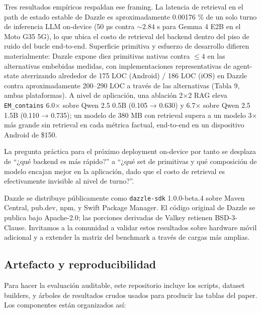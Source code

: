 Tres resultados empíricos respaldan ese framing. La latencia de retrieval en el
path de estado estable de Dazzle es aproximadamente 0.00176 \% de un solo turno
de inferencia LLM on-device (50 µs contra \(\sim 2.84\) s para Gemma 4 E2B en el
Moto G35 5G), lo que ubica el costo de retrieval del backend dentro del piso de
ruido del bucle end-to-end. Superficie primitiva y esfuerzo de desarrollo
difieren materialmente: Dazzle expone diez primitivas nativas contra \(\leq 4\)
en las alternativas embebidas medidas, con implementaciones representativas de
agent-state aterrizando alrededor de 175 LOC (Android) / 186 LOC (iOS) en Dazzle
contra aproximadamente 200--290 LOC a través de las alternativas (Tabla 9, ambas
plataformas). A nivel de aplicación, una ablación 2×2 RAG eleva
\texttt{EM\_contains} 6.0× sobre Qwen 2.5 0.5B (0.105 → 0.630) y 6.7× sobre Qwen
2.5 1.5B (0.110 → 0.735); un modelo de 380 MB con retrieval supera a un modelo
3× más grande sin retrieval en cada métrica factual, end-to-end en un
dispositivo Android de \$150.

La pregunta práctica para el próximo deployment on-device por tanto se desplaza
de ``¿qué backend es más rápido?'' a ``¿qué set de primitivas y qué composición
de modelo encajan mejor en la aplicación, dado que el costo de retrieval es
efectivamente invisible al nivel de turno?''.

Dazzle se distribuye públicamente como \texttt{dazzle-sdk} 1.0.0-beta.4 sobre
Maven Central, pub.dev, npm, y Swift Package Manager. El código original de
Dazzle se publica bajo Apache-2.0; las porciones derivadas de Valkey retienen
BSD-3-Clause. Invitamos a la comunidad a validar estos resultados sobre hardware
móvil adicional y a extender la matriz del benchmark a través de cargas más
amplias.

\subsection{Artefacto y reproducibilidad}\label{artefacto-y-reproducibilidad}

Para hacer la evaluación auditable, este repositorio incluye los scripts,
dataset builders, y árboles de resultados crudos usados para producir las tablas
del paper. Los componentes están organizados así:

